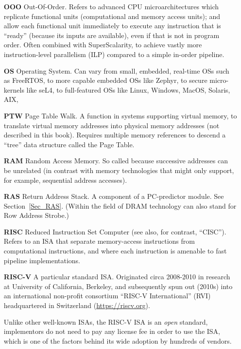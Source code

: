 \begin{itemize}
\item[\bf OOO] Out-Of-Order.  Refers to advanced CPU
  microarchitectures which replicate functional units (computational
  and memory access units); and allow each functional unit immediately
  to execute any instruction that is ``ready'' (because its inputs are
  available), even if that is not in program order.  Often combined
  with SuperScalarity, to achieve vastly more instruction-level
  parallelism (ILP) compared to a simple in-order pipeline.

\item[\bf OS] Operating System.  Can vary from small, embedded,
  real-time OSs such as FreeRTOS, to more capable embedded OSs like
  Zephyr, to secure micro-kernels like seL4, to full-featured OSs like
  Linux, Windows, MacOS, Solaris, AIX, {\etc}

\item[\bf PTW] Page Table Walk.  A function in systems supporting
  virtual memory, to translate virtual memory addresses into physical
  memory addresses (not described in this book).  Requires multiple
  memory references to descend a ``tree'' data structure called the
  Page Table.

\item[\bf RAM] Random Access Memory.  So called because successive
  addresses can be unrelated (in contrast with memory technologies
  that might only support, for example, sequential address accesses).

\item[\bf RAS] Return Address Stack.  A component of a PC-predictor
  module.  See Section~\ref{Sec_RAS}.  (Within the field of DRAM
  technology can also stand for Row Address Strobe.)

\item[\bf RISC] Reduced Instruction Set Computer (see also, for
  contrast, ``CISC'').  Refers to an ISA that separate memory-access
  instructions from computational instructions, and where each
  instruction is amenable to fast pipeline implementations.

\item[\bf RISC-V] A particular standard ISA.  Originated circa
  2008-2010 in research at University of California, Berkeley, and
  subsequently spun out (2010s) into an international non-profit
  consortium ``RISC-V International'' (RVI) headquartered in
  Switzerland (\url{https://riscv.org}).

  Unlike other well-known ISAs, the RISC-V ISA is an \emph{open}
  standard, {\ie} implementors do not need to pay any license fee in
  order to use the ISA, which is one of the factors behind its wide
  adoption by hundreds of vendors.


\end{itemize}
